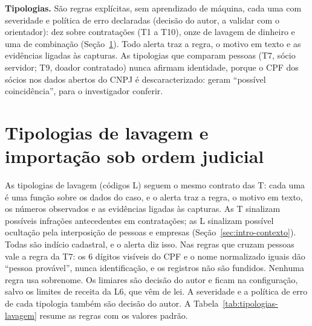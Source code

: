 \textbf{Tipologias.} São regras explícitas, sem aprendizado de máquina,
cada uma com severidade e política de erro declaradas (decisão do autor, a
validar com o orientador): dez sobre contratações (T1 a T10), onze de
lavagem de dinheiro e uma de combinação
(Seção~\ref{sec:desenv-lavagem}). Todo alerta traz a regra, o motivo em texto e as
evidências ligadas às capturas. As tipologias que comparam pessoas (T7, sócio
servidor; T9, doador contratado) nunca afirmam identidade, porque o CPF dos
sócios nos dados abertos do CNPJ é descaracterizado: geram ``possível
coincidência'', para o investigador conferir.

\section{Tipologias de lavagem e importação sob ordem judicial}
\label{sec:desenv-lavagem}

As tipologias de lavagem (códigos L) seguem o mesmo contrato das T: cada
uma é uma função sobre os dados do caso, e o alerta traz a regra, o motivo
em texto, os números observados e as evidências ligadas às capturas. As T
sinalizam possíveis infrações antecedentes em contratações; as L sinalizam
possível ocultação pela interposição de pessoas e empresas
(Seção~\ref{sec:intro-contexto}). Todas são indício cadastral, e o alerta
diz isso. Nas regras que cruzam pessoas vale a regra da T7: os 6 dígitos
visíveis do CPF e o nome normalizado iguais dão ``pessoa provável'', nunca
identificação, e os registros não são fundidos. Nenhuma regra usa
sobrenome. Os limiares são decisão do autor e ficam na configuração, salvo
os limites de receita da L6, que vêm de lei. A severidade e a política de
erro de cada tipologia também são decisão do autor. A
Tabela~\ref{tab:tipologias-lavagem} resume as regras com os valores padrão.

